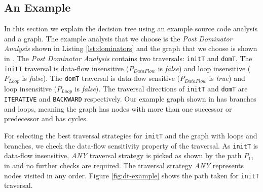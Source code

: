 \subsection{An Example}
\label{subsec:example}
In this section we explain the decision tree using an example source code analysis
and a graph.
The example analysis that we choose is the {\em Post Dominator Analysis} shown
in Listing \ref{lst:dominators} and the graph that we choose is shown in
.
The \textit{Post Dominator Analysis} contains two traversals: \lstinline|initT|
and \lstinline|domT|. 
The \lstinline|initT| traversal is data-flow insensitive ($P_{DataFlow}$ is
\textit{false}) and loop insensitive ($P_{Loop}$ is \textit{false}). The
\lstinline|domT| traversal is data-flow sensitive ($P_{DataFlow}$ is
\textit{true}) and loop insensitive ($P_{Loop}$ is \textit{false}). The
traversal directions of \lstinline|initT| and \lstinline|domT| are
\lstinline|ITERATIVE| and \lstinline|BACKWARD| respectively. 
Our example graph shown in  has branches and loops, 
meaning the graph has nodes with more than one successor or
predecessor and has cycles.
% 
% 

For selecting the best traversal strategies for \lstinline|initT| and the graph
with loops and branches, we check the data-flow sensitivity property of the
traversal.
As \lstinline|initT| is data-flow insensitive, \textit{ANY} traversal strategy
is picked as shown by the path $P_{11}$ in  and no
further checks are required. The traversal strategy \textit{ANY} represents
nodes visited in any order. Figure \ref{fig:dt-example} shows the path taken for \lstinline|initT| traversal.

